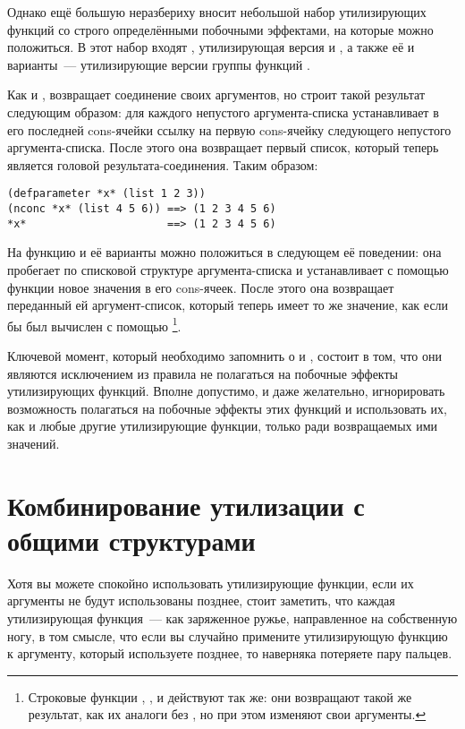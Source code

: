 Однако ещё большую неразбериху вносит небольшой набор утилизирующих функций со строго
определёнными побочными эффектами, на которые можно положиться. В этот набор входят
, утилизирующая версия  и , а также её  и
 варианты~--- утилизирующие версии группы функций .

Как и ,  возвращает соединение своих аргументов, но строит такой
результат следующим образом: для каждого непустого аргумента-списка 
устанавливает в  его последней cons-ячейки ссылку на первую cons-ячейку
следующего непустого аргумента-списка. После этого она возвращает первый список, который
теперь является головой результата-соединения. Таким образом:

\begin{lstlisting}
(defparameter *x* (list 1 2 3))
(nconc *x* (list 4 5 6)) ==> (1 2 3 4 5 6)
*x*                      ==> (1 2 3 4 5 6)
\end{lstlisting}

На функцию  и её варианты можно положиться в следующем её поведении: она
пробегает по списковой структуре аргумента-списка и устанавливает с помощью функции
 новое значения в  его cons-ячеек. После этого она возвращает
переданный ей аргумент-список, который теперь имеет то же значение, как если бы был
вычислен с помощью \footnote{Строковые функции
  , , и  действуют
  так же: они возвращают такой же результат, как их аналоги без , но при этом
  изменяют свои аргументы.}.

Ключевой момент, который необходимо запомнить о  и , состоит
в том, что они являются исключением из правила не полагаться на побочные эффекты
утилизирующих функций. Вполне допустимо, и даже желательно, игнорировать возможность
полагаться на побочные эффекты этих функций и использовать их, как и любые другие
утилизирующие функции, только ради возвращаемых ими значений.

\section{Комбинирование утилизации с общими структурами}

Хотя вы можете спокойно использовать утилизирующие функции, если их аргументы не будут
использованы позднее, стоит заметить, что каждая утилизирующая функция~--- как заряженное
ружье, направленное на собственную ногу, в том смысле, что если вы случайно примените
утилизирующую функцию к аргументу, который используете позднее, то наверняка потеряете
пару пальцев.

